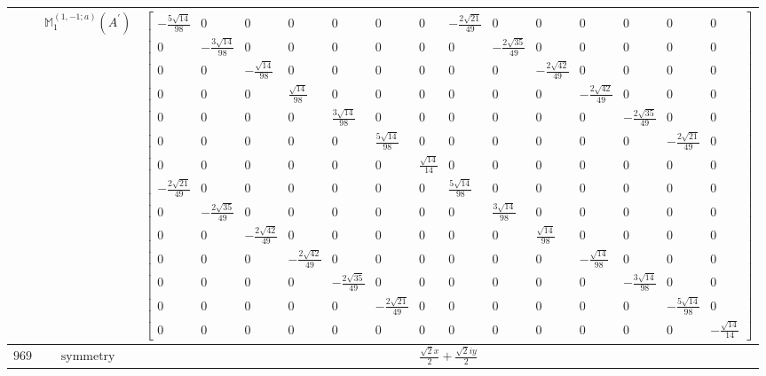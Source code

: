 \documentclass[fleqn,8pt,landscape]{jsarticle}
\begin{document}
\begin{longtable}{ccc}
$  $ & $ \mathbb{M}_{1}^{(1,-1;a)}(A^{\prime}) $ & $ \begin{bmatrix} - \frac{5 \sqrt{14}}{98} & 0 & 0 & 0 & 0 & 0 & 0 & - \frac{2 \sqrt{21}}{49} & 0 & 0 & 0 & 0 & 0 & 0 \\ 0 & - \frac{3 \sqrt{14}}{98} & 0 & 0 & 0 & 0 & 0 & 0 & - \frac{2 \sqrt{35}}{49} & 0 & 0 & 0 & 0 & 0 \\ 0 & 0 & - \frac{\sqrt{14}}{98} & 0 & 0 & 0 & 0 & 0 & 0 & - \frac{2 \sqrt{42}}{49} & 0 & 0 & 0 & 0 \\ 0 & 0 & 0 & \frac{\sqrt{14}}{98} & 0 & 0 & 0 & 0 & 0 & 0 & - \frac{2 \sqrt{42}}{49} & 0 & 0 & 0 \\ 0 & 0 & 0 & 0 & \frac{3 \sqrt{14}}{98} & 0 & 0 & 0 & 0 & 0 & 0 & - \frac{2 \sqrt{35}}{49} & 0 & 0 \\ 0 & 0 & 0 & 0 & 0 & \frac{5 \sqrt{14}}{98} & 0 & 0 & 0 & 0 & 0 & 0 & - \frac{2 \sqrt{21}}{49} & 0 \\ 0 & 0 & 0 & 0 & 0 & 0 & \frac{\sqrt{14}}{14} & 0 & 0 & 0 & 0 & 0 & 0 & 0 \\ - \frac{2 \sqrt{21}}{49} & 0 & 0 & 0 & 0 & 0 & 0 & \frac{5 \sqrt{14}}{98} & 0 & 0 & 0 & 0 & 0 & 0 \\ 0 & - \frac{2 \sqrt{35}}{49} & 0 & 0 & 0 & 0 & 0 & 0 & \frac{3 \sqrt{14}}{98} & 0 & 0 & 0 & 0 & 0 \\ 0 & 0 & - \frac{2 \sqrt{42}}{49} & 0 & 0 & 0 & 0 & 0 & 0 & \frac{\sqrt{14}}{98} & 0 & 0 & 0 & 0 \\ 0 & 0 & 0 & - \frac{2 \sqrt{42}}{49} & 0 & 0 & 0 & 0 & 0 & 0 & - \frac{\sqrt{14}}{98} & 0 & 0 & 0 \\ 0 & 0 & 0 & 0 & - \frac{2 \sqrt{35}}{49} & 0 & 0 & 0 & 0 & 0 & 0 & - \frac{3 \sqrt{14}}{98} & 0 & 0 \\ 0 & 0 & 0 & 0 & 0 & - \frac{2 \sqrt{21}}{49} & 0 & 0 & 0 & 0 & 0 & 0 & - \frac{5 \sqrt{14}}{98} & 0 \\ 0 & 0 & 0 & 0 & 0 & 0 & 0 & 0 & 0 & 0 & 0 & 0 & 0 & - \frac{\sqrt{14}}{14} \end{bmatrix} $ \\ \hline
$ 969 $ & $ \text{symmetry} $ & $ \frac{\sqrt{2} x}{2} + \frac{\sqrt{2} i y}{2} $ \\

\end{longtable}
\end{document}

